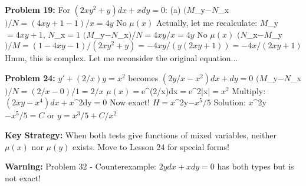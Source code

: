 \documentclass[12pt]{article}
\begin{document}
\textbf{Problem 19:}
For $(2xy^{2} + y)dx + xdy = 0$:
(a) $(M$_{y}$ - N$_{x}$)/N = (4xy + 1 - 1)/x = 4y$ \rightarrow No $\mu(x)$
Actually, let me recalculate: $M$_{y}$ = 4xy + 1$, $N$_{x}$ = 1$
$(M$_{y}$ - N$_{x}$)/N = 4xy/x = 4y$ \rightarrow No $\mu(x)$
$(N$_{x}$ - M$_{y}$)/M = (1 - 4xy - 1)/(2xy^{2} + y) = -4xy/(y(2xy + 1)) = -4x/(2xy + 1)$
Hmm, this is complex. Let me reconsider the original equation...

\textbf{Problem 24:}
$y' + (2/x)y = x^{2}$ becomes $(2y/x - x^{2})dx + dy = 0$
$(M$_{y}$ - N$_{x}$)/N = (2/x - 0)/1 = 2/x$
$\mu(x) = $e^{\int(2/x)dx}$ = $e^{2\ln|x|}$ = x^{2}$
Multiply: $(2xy - x^{4})dx + x$^{2dy}$ = 0$
Now exact! $H = x$^{2y}$ - x^{5}/5$
Solution: $x$^{2y}$ - x^{5}/5 = C$ or $y = x^{3}/5 + C/x^{2}$

\textbf{Key Strategy:} When both tests give functions of mixed variables, neither $\mu(x)$ nor $\mu(y)$ exists. Move to Lesson 24 for special forms!

\textbf{Warning:} Problem 32 - Counterexample: $2ydx + xdy = 0$ has both types but is not exact!
\end{document}
